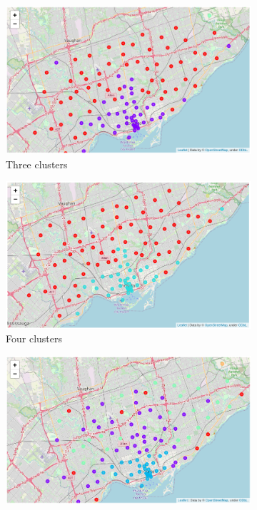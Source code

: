 \documentclass{article}
\begin{document}
\begin{figure}[ht]
     \centering
     \begin{subfigure}[b]{0.47\textwidth}
         \centering
         \includegraphics[width=\textwidth]{pics/clusters3}
         \caption{Three clusters}
     \end{subfigure}
     \hfill
     \begin{subfigure}[b]{0.47\textwidth}
         \centering
         \includegraphics[width=\textwidth]{pics/clusters4}
         \caption{Four clusters}
     \end{subfigure}
     \begin{subfigure}[b]{0.47\textwidth}
         \centering
         \includegraphics[width=\textwidth]{pics/clusters5}

\end{subfigure}
\end{figure}
\end{document}
